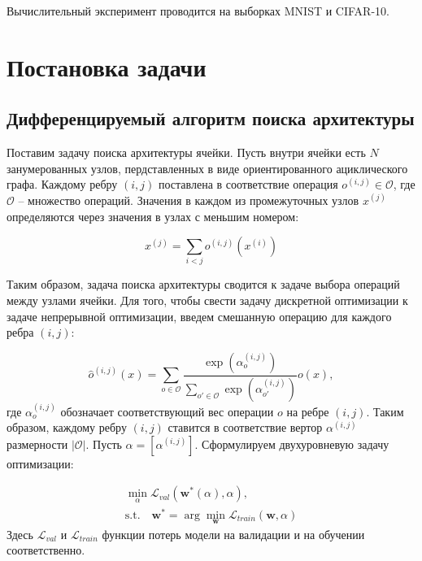 \documentclass[12pt, twoside]{article}
\begin{document}
Вычислительный эксперимент проводится на выборках MNIST\cite{lecun-mnisthandwrittendigit-2010} и CIFAR-10\cite{cif}.

\section{Постановка задачи}

\subsection{Дифференцируемый алгоритм поиска архитектуры}

Поставим задачу поиска архитектуры ячейки.
 Пусть внутри ячейки есть $N$ занумерованных узлов, пердставленных в виде ориентированного ациклического графа. Каждому ребру $(i, j)$ поставлена в соответствие операция $o^{(i, j)} \in \mathcal{O}$, где $\mathcal{O}$ -- множество операций. Значения в каждом из промежуточных узлов $x^{(j)}$ определяются через значения в узлах с меньшим номером:
 
 \begin{equation}
 x^{(j)} = \sum_{i < j}o^{(i, j)}(x^{(i)})
 \end{equation}
 
 Таким образом, задача поиска архитектуры сводится к задаче выбора операций между узлами ячейки. Для того, чтобы свести задачу дискретной оптимизации к задаче непрерывной оптимизации, введем смешанную операцию для каждого ребра $(i, j)$:

\begin{equation}
\hat{o}^{(i, j)}(x) = \sum_{o\in \mathcal{O}} \frac{\exp(\alpha_o^{(i, j)})}{\sum_{o'\in\mathcal{O}} \exp(\alpha_{o'}^{(i, j)})}o(x),
\end{equation}
где $\alpha_o^{(i, j)}$ обозначает соответствующий вес операции $o$ на ребре $(i, j)$. Таким образом, каждому ребру $(i, j)$ ставится в соответствие вертор $\alpha^{(i, j)}$ размерности $|\mathcal{O}|$. Пусть $\alpha = [\alpha^{(i, j)}]$. Сформулируем двухуровневую задачу оптимизации:

\begin{equation}
\begin{aligned}
\min_{\alpha}\mathcal{L}_{val}(\mathbf{w}^*(\alpha), \alpha),\\
 \mathrm{s.t.}\quad \mathbf{w}^* = \arg\min_{\mathbf{w}}\mathcal{L}_{train}(\mathbf{w}, \alpha)
 \end{aligned}
\end{equation}
Здесь $\mathcal{L}_{val}$ и $\mathcal{L}_{train}$ функции потерь модели на валидации и на обучении соответственно.
\end{document}
